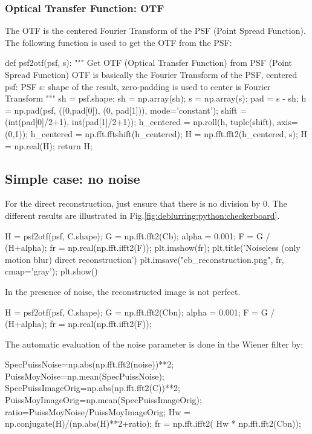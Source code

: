 \subsubsection{Optical Transfer Function: OTF}
The OTF is the centered Fourier Transform of the PSF (Point Spread Function). The following function is used to get the OTF from the PSF:
\begin{python}
def psf2otf(psf, s):
    """
    Get OTF (Optical Transfer Function) from PSF (Point Spread Function)
    OTF is basically the Fourier Transform of the PSF, centered
    psf: PSF 
    s: shape of the result, zero-padding is used to center is Fourier Transform
    """
    sh = psf.shape;
    sh = np.array(sh);
    s = np.array(s);
    pad = s - sh;
    h = np.pad(psf, ((0,pad[0]), (0, pad[1])), mode='constant');
    shift = (int(pad[0]/2+1), int(pad[1]/2+1));
    h_centered = np.roll(h, tuple(shift), axis=(0,1));
    h_centered = np.fft.fftshift(h_centered);
    H = np.fft.fft2(h_centered, s);
    H = np.real(H);
    return H;
\end{python}

\vspace*{-8pt}

\subsection{Simple case: no noise}
For the direct reconstruction, just ensure that there is no division by 0. The different results are illustrated in Fig.\ref{fig:deblurring:python:checkerboard}.

\begin{python}
H = psf2otf(psf, C.shape);
G = np.fft.fft2(Cb);
alpha =  0.001;
F = G / (H+alpha);
fr = np.real(np.fft.ifft2(F));
plt.imshow(fr);
plt.title('Noiseless (only motion blur) direct reconstruction')
plt.imsave("cb_reconstruction.png", fr, cmap='gray');
plt.show()
\end{python}

In the presence of noise, the reconstructed image is not perfect.
\begin{python}
H = psf2otf(psf, C.shape);
G = np.fft.fft2(Cbn);
alpha =  0.001;
F = G / (H+alpha);
fr = np.real(np.fft.ifft2(F));
\end{python}

The automatic evaluation of the noise parameter is done in the Wiener filter by:
\begin{python}
SpecPuissNoise=np.abs(np.fft.fft2(noise))**2;
PuissMoyNoise=np.mean(SpecPuissNoise);
SpecPuissImageOrig=np.abs(np.fft.fft2(C))**2;
PuissMoyImageOrig=np.mean(SpecPuissImageOrig);
ratio=PuissMoyNoise/PuissMoyImageOrig;
Hw = np.conjugate(H)/(np.abs(H)**2+ratio);
fr = np.fft.ifft2( Hw * np.fft.fft2(Cbn));
\end{python}

